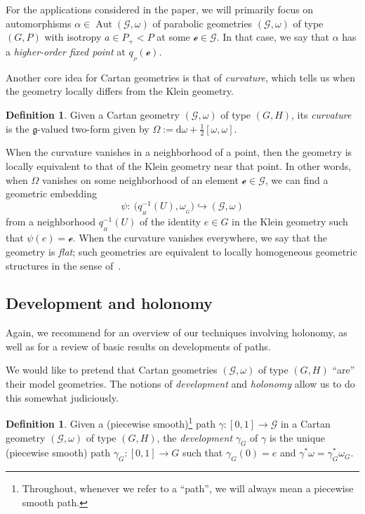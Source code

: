 \documentclass[10pt,a4paper]{amsart}
\numberwithin{equation}{section}
\theoremstyle{definition}
\newtheorem{Definition}[Theorem]{Definition}
\DeclareMathOperator{\Aut}{\mathrm{Aut}}
\newcommand{\MC}[1]{\omega_{{}_{#1}}}
\begin{document}
For the applications considered in the paper, we will primarily focus on automorphisms $\alpha\in\Aut(\mathscr{G},\omega)$ of parabolic geometries $(\mathscr{G},\omega)$ of type $(G,P)$ with isotropy $a\in P_+<P$ at some $\mathscr{e}\in\mathscr{G}$. In that case, we say that $\alpha$ has a \emph{higher-order fixed point} at $q_{{}_P}(\mathscr{e})$.

Another core idea for Cartan geometries is that of \emph{curvature}, which tells us when the geometry locally differs from the Klein geometry.

\begin{Definition}Given a Cartan geometry $(\mathscr{G},\omega)$ of type $(G,H)$, its \emph{curvature} is the $\mathfrak{g}$-valued two-form given by $\Omega:=\mathrm{d}\omega+\tfrac{1}{2}[\omega,\omega]$.\end{Definition}

When the curvature vanishes in a neighborhood of a point, then the geometry is locally equivalent to that of the Klein geometry near that point. In other words, when $\Omega$ vanishes on some neighborhood of an element $\mathscr{e}\in\mathscr{G}$, we can find a geometric embedding \[\psi\colon \ \bigl(q_{{}_H}^{-1}(U),\MC{G}\bigr)\hookrightarrow (\mathscr{G},\omega)\] from a neighborhood $q_{{}_H}^{-1}(U)$ of the identity $e\in G$ in the Klein geometry such that $\psi(e)=\mathscr{e}$. When the curvature vanishes everywhere, we say that the geometry is \emph{flat}; such geometries are equivalent to locally homogeneous geometric structures in the sense of~\cite{Goldman2022}.

\subsection{Development and holonomy}
Again, we recommend \cite{HolonomyPaper} for an overview of our techniques involving holonomy, as well as \cite[Chapter~3, Section~7]{Sharpe1997} for a review of basic results on developments of paths.

We would like to pretend that Cartan geometries $(\mathscr{G},\omega)$ of type $(G,H)$ ``are'' their model geometries. The notions of \emph{development} and \emph{holonomy} allow us to do this somewhat judiciously.

\begin{Definition}Given a (piecewise smooth)\footnote{Throughout, whenever we refer to a ``path'', we will always mean a piecewise smooth path.} path $\gamma\colon [0,1]\to\mathscr{G}$ in a Cartan geometry $(\mathscr{G},\omega)$ of type $(G,H)$, the \emph{development} $\gamma_G$ of $\gamma$ is the unique (piecewise smooth) path $\gamma_G\colon [0,1]\to G$ such that $\gamma_G(0)=e$ and $\gamma^*\omega=\gamma_G^*\omega_G$.
\end{Definition}
\end{document}

